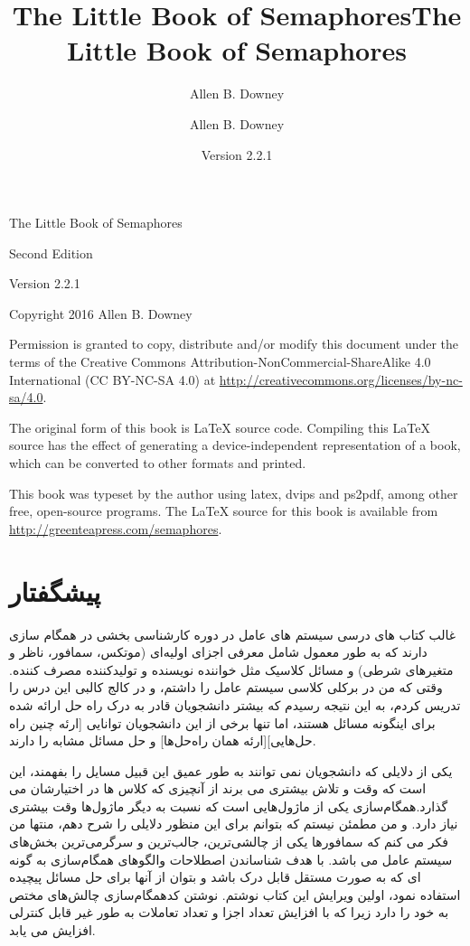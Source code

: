 \documentclass{book}
\title{The Little Book of Semaphores}
\author{Allen B. Downey}
\newcommand{\theversion}{Version 2.2.1}
\begin{document}
\title {The Little Book of Semaphores}
\author {Allen B. Downey}

\date {\theversion}
\maketitle

\vspace{2in}
\begin{center}
{\Large The Little Book of Semaphores}

Second Edition
\vspace{0.25in}

\theversion
\vspace{0.25in}

Copyright 2016 Allen B. Downey
\end{center}
\vspace{0.25in}

Permission is granted to copy, distribute and/or modify this
document under the terms of the Creative Commons
Attribution-NonCommercial-ShareAlike 4.0 International (CC BY-NC-SA 4.0)
at \url{http://creativecommons.org/licenses/by-nc-sa/4.0}.

The original form of this book is LaTeX source code.
Compiling this LaTeX source has the effect of generating
a device-independent representation of a book, which
can be converted to other formats and printed.

This book was typeset by the author using latex, dvips and ps2pdf,
among other free, open-source programs.
The LaTeX source for this book is available from
\url{http://greenteapress.com/semaphores}.

\frontmatter

\chapter{پیشگفتار}

غالب کتاب های درسی سیستم های عامل در دوره کارشناسی بخشی در همگام سازی دارند که به طور معمول شامل معرفی اجزای اولیه‌ای (موتکس، سمافور، ناظر و متغیر‌های شرطی) و مسائل کلاسیک مثل خواننده نویسنده و تولیدکننده مصرف کننده.
وقتی که من در برکلی کلاسی سیستم عامل را داشتم، و در کالج کالبی این درس را تدریس کردم، به این نتیجه رسیدم که بیشتر دانشجویان قادر به درک راه حل ارائه شده برای اینگونه مسائل هستند، اما تنها برخی از این دانشجویان توانایی [ارئه چنین راه حل‌هایی][ارئه همان راه‌حل‌ها] و  حل مسائل مشابه را دارند.

یکی از دلایلی که دانشجویان نمی توانند به طور عمیق این قبیل مسایل را بفهمند، این است که وقت و تلاش بیشتری می برند از آنچیزی که کلاس ها در اختیارشان می گذارد.همگام‌سازی یکی از ماژول‌هایی است که نسبت به دیگر ماژول‌ها وقت بیشتری نیاز دارد. و من مطمئن نیستم که بتوانم برای این منظور دلایلی را شرح دهم، منتها من فکر می کنم که سمافور‌ها یکی از چالشی‌ترین، جالب‌ترین و سرگرمی‌ترین بخش‌های سیستم عامل می باشد.
با هدف شناساندن  اصطلاحات والگوهای همگام‌سازی به گونه ای که به صورت مستقل قابل درک باشد و بتوان از آنها برای حل مسائل پیچیده استفاده نمود، اولین ویرایش این کتاب نوشتم.
نوشتن کدهمگام‌سازی چالش‌های مختص به خود را دارد زیرا که با افزایش تعداد اجزا و تعداد تعاملات به طور غیر قابل کنترلی افزایش می یابد.
\end{document}
